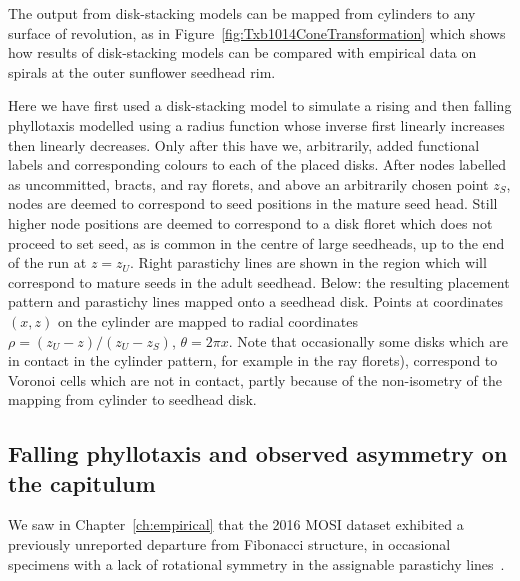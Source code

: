 The output from disk-stacking models can be mapped from cylinders to any surface of revolution, as in Figure~\ref{fig:Txb1014ConeTransformation} which shows how  results of disk-stacking models can be compared with empirical data on spirals at the outer sunflower seedhead rim. 

Here we have first used a disk-stacking model to simulate a rising and then falling phyllotaxis modelled using a radius function whose inverse first linearly increases then linearly decreases. Only after this have we, arbitrarily, added  functional labels and corresponding colours to each of the placed disks. After nodes labelled as uncommitted, bracts, and ray florets, and above an arbitrarily chosen point $z_S$, nodes are deemed to correspond to seed positions in the mature seed head.  Still higher node positions are deemed to correspond to a disk floret which does not proceed to set seed, as is common in the centre of large seedheads, up to the end of the run at $z=z_U$.   Right parastichy lines are shown in the region which will correspond to mature seeds in the adult seedhead. Below: the resulting placement pattern and parastichy lines mapped onto a seedhead disk. Points at coordinates $(x,z)$ on the cylinder are mapped to radial coordinates $\rho=(z_U-z)/(z_U-z_S)$, $\theta=2\pi x$. Note that occasionally some disks which are in contact in the cylinder pattern, for example in the ray florets), correspond to Voronoi cells which are not in  contact, partly because of the non-isometry of the mapping from cylinder to seedhead disk.
%

 

\subsection{Falling phyllotaxis and observed asymmetry on the capitulum}
We saw in Chapter~\ref{ch:empirical} that the 2016 MOSI dataset exhibited  a previously unreported departure from Fibonacci structure, in occasional specimens with a lack of rotational symmetry in the assignable parastichy lines~\cite{swintonNovelFibonacciNonFibonacci2016}. 

